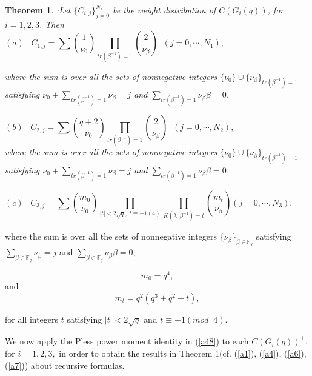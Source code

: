 \documentclass[a4,12pt]{elsart}
\newtheorem{theorem}{Theorem}
\begin{document}
\begin{theorem}:\label{S}
 Let $\{C_{i,j}\}_{j=0}^{N_{i}}$ be the weight distribution of $C(G_i(q) )$, for $i=1, 2, 3$. Then
\begin{equation*}
(a) \;\;\;  C_{1,j}=\sum \binom{1}{\nu_0} \prod_{tr( \beta^{-1})=1}
\binom{2}{\nu_ \beta} \;\; (j=0,\cdots, N_1),  \qquad
\qquad\qquad\qquad\qquad\qquad
\end{equation*}

where the sum is over all the sets of nonnegative integers $\{ \nu_0
\} \cup \{ \nu_ \beta \}_{tr( \beta^{-1})=1}$ satisfying $ \nu_0+
\sum_{tr(\beta^{-1})=1}^{} \nu_\beta=j$ and
$\sum_{tr(\beta^{-1})=1}^{} \nu_{\beta} \beta=0$.

\begin{equation*}
(b) \;\;\; C_{2,j}=\sum \binom{q+2}{\nu_0} \prod_{tr (\beta^{-1})=1}
\binom{2}{\nu_\beta} \;\; (j=0,\cdots, N_2),\qquad\qquad\qquad\qquad
\;\;\;\;\;\;\;\;
\end{equation*}
where the sum is over all the sets of nonnegative integers $\{ \nu_0
\} \cup \{ \nu_ \beta \}_{tr( \beta^{-1})=1}$ satisfying $ \nu_0+
\sum_{tr(\beta^{-1})=1}^{} \nu_\beta=j$ and
$\sum_{tr(\beta^{-1})=1}^{} \nu_{\beta} \beta=0$.
\end{theorem}

\begin{equation*}
 (c) \;\;\; C_{3,j}=\sum \binom{m_0}{\nu_0} \prod_{ |t |<2 \sqrt{
q}, \; t \equiv -1(4)} \prod_{K(\lambda;\beta^{-1})=t}
\binom{m_t}{\nu_\beta }(j=0,\cdots, N_3),\qquad\qquad\qquad\qquad
\end{equation*}

where the sum is over all the sets of nonnegative integers $\{\nu_
\beta \}_{ \beta \in {\mathbb{F}}_q}$ satisfying $\sum_{\beta \in {\mathbb{F}}_q}^{}
\nu_\beta=j$ and $\sum_{\beta \in {\mathbb{F}}_q}^{} \nu_{\beta} \beta=0$,

\begin{equation*}
m_0=q^4,
\end{equation*}
and
\begin{equation*}
m_t=q^2(q^3 +q^2 -t),
\end{equation*}

for all integers $t$ satisfying $ |t|<2 \sqrt{q}$ and $t \equiv -1
(mod \;\; 4)$.

We now apply the Pless power moment identity in (\ref{a48}) to each
$C(G_i(q))^\bot$, for $i=1, 2, 3,$ in order to obtain the results in
Theorem 1(cf. (\ref{a1}), (\ref{a4}), (\ref{a6}), (\ref{a7})) about
recursive formulas.
\end{document}
